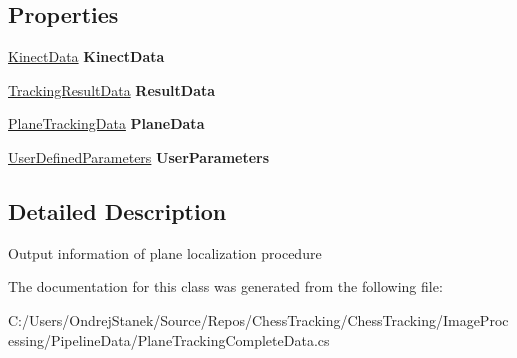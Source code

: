 \subsection*{Properties}
\begin{DoxyCompactItemize}
\item 
\mbox{\label{class_chess_tracking_1_1_image_processing_1_1_pipeline_data_1_1_plane_tracking_complete_data_a6c9d29b02d105b120a02e4968550fdbc}} 
\mbox{\hyperlink{class_chess_tracking_1_1_image_processing_1_1_pipeline_data_1_1_kinect_data}{Kinect\+Data}} {\bfseries Kinect\+Data}
\item 
\mbox{\label{class_chess_tracking_1_1_image_processing_1_1_pipeline_data_1_1_plane_tracking_complete_data_a2a5207a8ccb0ad824bba90596df8589d}} 
\mbox{\hyperlink{class_chess_tracking_1_1_image_processing_1_1_pipeline_data_1_1_tracking_result_data}{Tracking\+Result\+Data}} {\bfseries Result\+Data}
\item 
\mbox{\label{class_chess_tracking_1_1_image_processing_1_1_pipeline_data_1_1_plane_tracking_complete_data_a00ab5330333b37b85d5ba66b9802cb56}} 
\mbox{\hyperlink{class_chess_tracking_1_1_image_processing_1_1_pipeline_data_1_1_plane_tracking_data}{Plane\+Tracking\+Data}} {\bfseries Plane\+Data}
\item 
\mbox{\label{class_chess_tracking_1_1_image_processing_1_1_pipeline_data_1_1_plane_tracking_complete_data_a1728feb38800401458e937c70f6cf816}} 
\mbox{\hyperlink{class_chess_tracking_1_1_image_processing_1_1_pipeline_data_1_1_user_defined_parameters}{User\+Defined\+Parameters}} {\bfseries User\+Parameters}
\end{DoxyCompactItemize}


\subsection{Detailed Description}
Output information of plane localization procedure 



The documentation for this class was generated from the following file\+:\begin{DoxyCompactItemize}
\item 
C\+:/\+Users/\+Ondrej\+Stanek/\+Source/\+Repos/\+Chess\+Tracking/\+Chess\+Tracking/\+Image\+Processing/\+Pipeline\+Data/Plane\+Tracking\+Complete\+Data.\+cs\end{DoxyCompactItemize}
